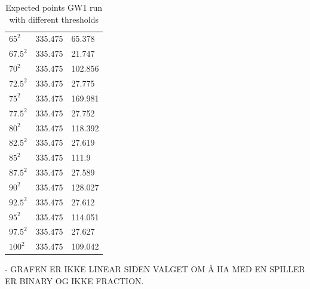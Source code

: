 \begin{table}[H]
\begin{tabular}{@{}lll@{}}
$65^2$      & 335.475             & 65.378             \\
$67.5^2$    & 335.475             & 21.747             \\
$70^2$      & 335.475             & 102.856            \\
$72.5^2$     & 335.475             & 27.775             \\
$75^2$      & 335.475             & 169.981            \\
$77.5^2$    & 335.475             & 27.752             \\
$80^2$      & 335.475             & 118.392            \\
$82.5^2$    & 335.475             & 27.619             \\
$85^2$      & 335.475             & 111.9              \\
$87.5^2$    & 335.475             & 27.589             \\
$90^2$      & 335.475             & 128.027            \\
$92.5^2$    & 335.475             & 27.612             \\
$95^2$      & 335.475             & 114.051            \\
$97.5^2$    & 335.475             & 27.627             \\
$100^2$     & 335.475             & 109.042            \\ \bottomrule
\end{tabular}
\caption{Expected points GW1 run with different thresholds}
\label{tab: threshold_expected_points_gw1}
\end{table}
- GRAFEN ER IKKE LINEAR SIDEN VALGET OM Å HA MED EN SPILLER ER BINARY OG IKKE FRACTION. 

